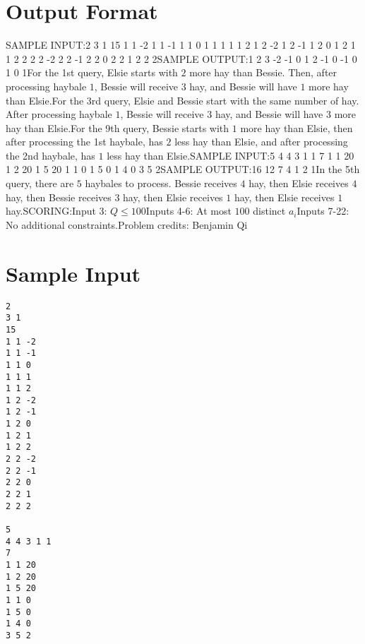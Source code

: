 \documentclass[12pt]{article}
\begin{document}
\section*{Output Format}
SAMPLE INPUT:2
3 1
15
1 1 -2
1 1 -1
1 1 0
1 1 1
1 1 2
1 2 -2
1 2 -1
1 2 0
1 2 1
1 2 2
2 2 -2
2 2 -1
2 2 0
2 2 1
2 2 2SAMPLE OUTPUT:1
2
3
-2
-1
0
1
2
-1
0
-1
0
1
0
1For the 1st query, Elsie starts with $2$ more hay than Bessie. Then, after
processing haybale $1$, Bessie will receive $3$ hay, and Bessie will have $1$
more hay than Elsie.For the 3rd query, Elsie and Bessie start with the same number of hay. After
processing haybale $1$, Bessie will receive $3$ hay, and Bessie will have $3$
more hay than Elsie.For the 9th query, Bessie starts with $1$ more hay than Elsie, then after
processing the 1st haybale, has $2$ less hay than Elsie, and after processing
the 2nd haybale, has $1$ less hay than Elsie.SAMPLE INPUT:5
4 4 3 1 1
7
1 1 20
1 2 20
1 5 20
1 1 0
1 5 0
1 4 0
3 5 2SAMPLE OUTPUT:16
12
7
4
1
2
1In the 5th query, there are $5$ haybales to process. Bessie receives $4$ hay, then Elsie
receives $4$ hay, then Bessie receives $3$ hay, then Elsie receives $1$ hay,
then Elsie receives $1$ hay.SCORING:Input 3: $Q\le 100$Inputs 4-6: At most $100$ distinct $a_i$Inputs 7-22: No additional constraints.Problem credits: Benjamin Qi

\section*{Sample Input}
\begin{verbatim}
2
3 1
15
1 1 -2
1 1 -1
1 1 0
1 1 1
1 1 2
1 2 -2
1 2 -1
1 2 0
1 2 1
1 2 2
2 2 -2
2 2 -1
2 2 0
2 2 1
2 2 2

5
4 4 3 1 1
7
1 1 20
1 2 20
1 5 20
1 1 0
1 5 0
1 4 0
3 5 2
\end{verbatim}
\end{document}
